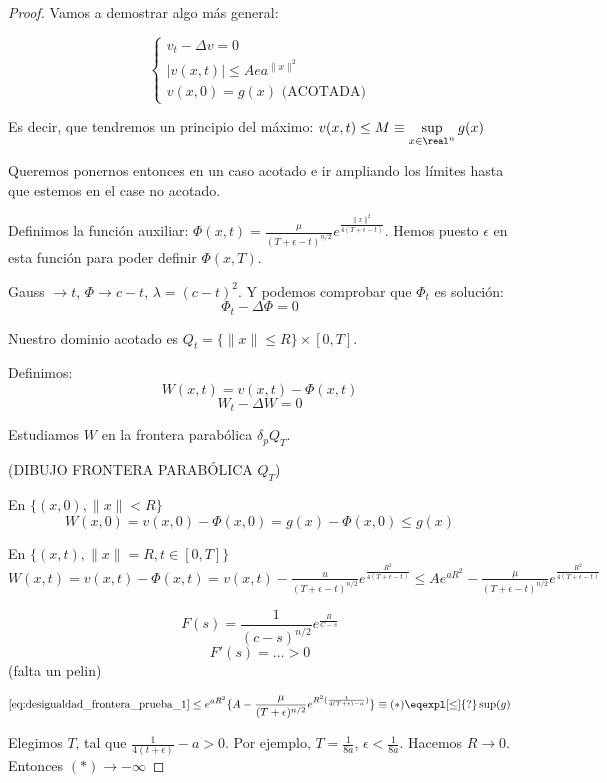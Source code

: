 			\begin{proof}
				Vamos a demostrar algo más general:

				\[\begin{cases}
					v_t - \Delta v = 0 \\
					|v(x,t)| \leq A ea^{\|x\|^2} \\
					v(x,0) = g(x) \text{ (ACOTADA)}
				\end{cases}\]

				Es decir, que tendremos un principio del máximo: $v(x,t) \leq M \equiv \sup\limits_{x \in \real^n} g(x)$

				Queremos ponernos entonces en un caso acotado e ir ampliando los límites hasta que estemos en el case no acotado.

				Definimos la función auxiliar: $\Phi(x,t) = \frac{\mu}{(T+\epsilon -t)^{n/2}} e^{\frac{\|x\|^2}{4(T + \epsilon - t)}}$. Hemos puesto $\epsilon$ en esta función para poder definir $\Phi(x,T)$.

				Gauss $\to t$, $\Phi \to c - t$, $\lambda = (c-t)^2$. Y podemos comprobar que $\Phi_t$ es solución:
				\[ \Phi_t - \Delta \Phi = 0\]

				Nuestro dominio acotado es $Q_t = \{ \|x\| \leq R \} \times [0,T]$.

				Definimos:
				\[ W(x,t) = v(x,t) - \Phi(x,t) \]
				\[ W_t - \Delta W = 0\]

				Estudiamos $W$ en la frontera parabólica $\delta_p Q_T$.


				(DIBUJO FRONTERA PARABÓLICA $Q_T$)

				En $\{(x,0), \|x\| < R\}$
				\[ W(x,0) = v(x,0) - \Phi(x,0) = g(x) - \Phi(x,0) \leq g(x) \]

				En $\{(x,t), \|x\| = R, t \in [0,T]\}$
				\( W(x,t) = v(x,t) - \Phi(x,t) = v(x,t) - \frac{u}{(T + \epsilon - t)^{n/2}} e^{\frac{R^2}{4(T+\epsilon-t)}} \leq Ae^{aR^2} - \frac{\mu}{(T + \epsilon -t)^{n/2}} e^{\frac{R^2}{4(T + \epsilon - t)}} \label{eq:desigualdad_frontera_prueba_1} \)

				\obs
				\[ F(s) = \frac{1}{(c-s)^{n/2}} e^{\frac{B}{C-s}}\]
				\[F'(s) = … > 0\]
				(falta un pelin)

				\[ \ref{eq:desigualdad_frontera_prueba_1} \leq e^{aR^2} \{A-\frac{\mu}{(T+\epsilon)^{n/2}} e^{R^2(\frac{1}{4(T+\epsilon)-a})}\} \equiv (*)\eqexpl[\leq]{?} \sup(g)\]

				Elegimos $T$, tal que $\frac{1}{4(t+\epsilon)}-a > 0$. Por ejemplo, $T = \frac{1}{8a}$, $\epsilon < \frac{1}{8a}$. Hacemos $R \to 0$. Entonces $(*) \to - \infty$


\end{proof}
